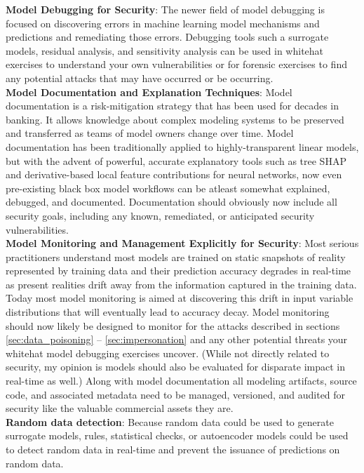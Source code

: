 \documentclass[fleqn]{article}
\begin{document}
\noindent\textbf{Model Debugging for Security}: The newer field of model debugging is focused on discovering errors in machine learning model mechanisms and predictions and remediating those errors. Debugging tools such a surrogate models, residual analysis, and sensitivity analysis can be used in whitehat exercises to understand your own vulnerabilities or for forensic exercises to find any potential attacks that may have occurred or be occurring.\\

\noindent\textbf{Model Documentation and Explanation Techniques}: Model documentation is a risk-mitigation strategy that has been used for decades in banking. It allows knowledge about complex modeling systems to be preserved and transferred as teams of model owners change over time. Model documentation has been traditionally applied to highly-transparent linear models, but with the advent of powerful, accurate explanatory tools such as tree SHAP and derivative-based local feature contributions for neural networks, now even pre-existing black box model workflows can be atleast somewhat explained, debugged, and documented. Documentation should obviously now include all security goals, including any known, remediated, or anticipated security vulnerabilities.\\

\noindent\textbf{Model Monitoring and Management Explicitly for Security}: Most serious practitioners understand most models are trained on static snapshots of reality represented by training data and their prediction accuracy degrades in real-time as present realities drift away from the information captured in the training data. Today most model monitoring is aimed at discovering this drift in input variable distributions that will eventually lead to accuracy decay. Model monitoring should now likely be designed to monitor for the attacks described in sections  \ref{sec:data_poisoning} -- \ref{sec:impersonation} and any other potential threats your whitehat model debugging exercises uncover. (While not directly related to security, my opinion is models should also be evaluated for disparate impact in real-time as well.) Along with model documentation all modeling artifacts, source code, and associated metadata need to be managed, versioned, and audited for security like the valuable commercial assets they are.\\

\noindent\textbf{Random data detection}: Because random data could be used to generate surrogate models, rules, statistical checks, or autoencoder models could be used to detect random data in real-time and prevent the issuance of predictions on random data.\\
\end{document}
